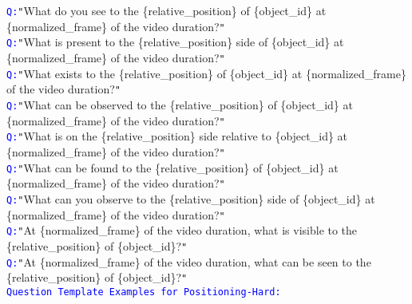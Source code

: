 \begin{figure*}[hbtp]
\begin{tcolorbox}[colback=gray!10,%
	colframe=black,%
	width=\textwidth,
	arc=1mm, auto outer arc,
	boxrule=0.5pt,
	]
        \texttt{\textcolor{blue}{Q:}}\texttt{"}What do you see to the \mbox{\{relative\_position\}} of \mbox{\{object\_id\}} at \mbox{\{normalized\_frame\}} of the video duration?\texttt{"}\\
        \texttt{\textcolor{blue}{Q:}}\texttt{"}What is present to the \mbox{\{relative\_position\}} side of \mbox{\{object\_id\}} at \mbox{\{normalized\_frame\}} of the video duration?\texttt{"}\\
        \texttt{\textcolor{blue}{Q:}}\texttt{"}What exists to the \mbox{\{relative\_position\}} of \mbox{\{object\_id\}} at \mbox{\{normalized\_frame\}} of the video duration?\texttt{"}\\
        \texttt{\textcolor{blue}{Q:}}\texttt{"}What can be observed to the \mbox{\{relative\_position\}} of \mbox{\{object\_id\}} at \mbox{\{normalized\_frame\}} of the video duration?\texttt{"}\\
        \texttt{\textcolor{blue}{Q:}}\texttt{"}What is on the \mbox{\{relative\_position\}} side relative to \mbox{\{object\_id\}} at \mbox{\{normalized\_frame\}} of the video duration?\texttt{"}\\
        \texttt{\textcolor{blue}{Q:}}\texttt{"}What can be found to the \mbox{\{relative\_position\}} of \mbox{\{object\_id\}} at \mbox{\{normalized\_frame\}} of the video duration?\texttt{"}\\
        \texttt{\textcolor{blue}{Q:}}\texttt{"}What can you observe to the \mbox{\{relative\_position\}} side of \mbox{\{object\_id\}} at \mbox{\{normalized\_frame\}} of the video duration?\texttt{"}\\
        \texttt{\textcolor{blue}{Q:}}\texttt{"}At \mbox{\{normalized\_frame\}} of the video duration, what is visible to the \mbox{\{relative\_position\}} of \mbox{\{object\_id\}}?\texttt{"}\\
        \texttt{\textcolor{blue}{Q:}}\texttt{"}At \mbox{\{normalized\_frame\}} of the video duration, what can be seen to the \mbox{\{relative\_position\}} of \mbox{\{object\_id\}}?\texttt{"}\\
  

  	\texttt{\textcolor{blue}{Question Template Examples for Positioning-Hard:}}


\end{tcolorbox}
\end{figure*}
